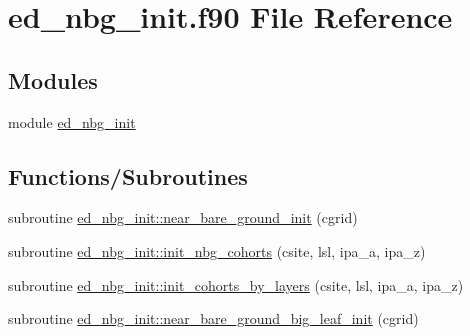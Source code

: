 \hypertarget{ed__nbg__init_8f90}{}\section{ed\+\_\+nbg\+\_\+init.\+f90 File Reference}
\label{ed__nbg__init_8f90}
\subsection*{Modules}
\begin{DoxyCompactItemize}
\item 
module \hyperlink{namespaceed__nbg__init}{ed\+\_\+nbg\+\_\+init}
\end{DoxyCompactItemize}
\subsection*{Functions/\+Subroutines}
\begin{DoxyCompactItemize}
\item 
subroutine \hyperlink{namespaceed__nbg__init_a301dee8c90b4ea9c4c259ac7bd6b97eb}{ed\+\_\+nbg\+\_\+init\+::near\+\_\+bare\+\_\+ground\+\_\+init} (cgrid)
\item 
subroutine \hyperlink{namespaceed__nbg__init_afbe4e1b96c81d4643f2b9e97fb7d2dd8}{ed\+\_\+nbg\+\_\+init\+::init\+\_\+nbg\+\_\+cohorts} (csite, lsl, ipa\+\_\+a, ipa\+\_\+z)
\item 
subroutine \hyperlink{namespaceed__nbg__init_ad7022181b12aec0f7e45270a2877dd49}{ed\+\_\+nbg\+\_\+init\+::init\+\_\+cohorts\+\_\+by\+\_\+layers} (csite, lsl, ipa\+\_\+a, ipa\+\_\+z)
\item 
subroutine \hyperlink{namespaceed__nbg__init_a9146f3e54e931abfb8c91e57df8958bc}{ed\+\_\+nbg\+\_\+init\+::near\+\_\+bare\+\_\+ground\+\_\+big\+\_\+leaf\+\_\+init} (cgrid)
\end{DoxyCompactItemize}
